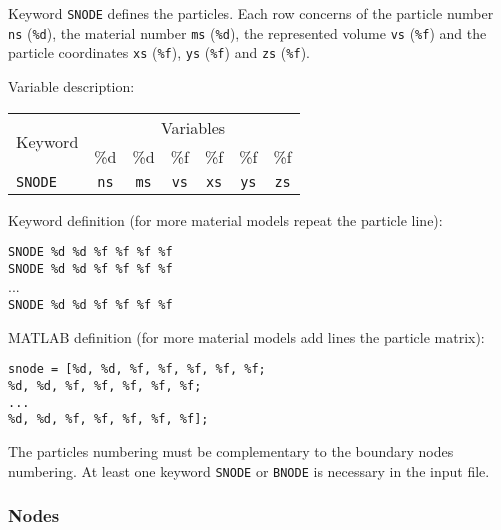Keyword \texttt{SNODE} defines the particles. Each row concerns of the particle number \texttt{ns} (\texttt{\%d}), the material number \texttt{ms} (\texttt{\%d}), the represented volume \texttt{vs} (\texttt{\%f}) and the particle coordinates \texttt{xs} (\texttt{\%f}), \texttt{ys} (\texttt{\%f}) and \texttt{zs} (\texttt{\%f}).

Variable description:

\begin{tabular}{|l|c|c|c|c|c|c|}
\hline
\multirow{2}{*}{Keyword} & \multicolumn{6}{c|}{Variables} \\ \cline{2-7}
& \%d & \%d & \%f & \%f & \%f & \%f \\ \hline
\texttt{SNODE} & \texttt{ns} & \texttt{ms} & \texttt{vs} & \texttt{xs} & \texttt{ys} & \texttt{zs} \\ \hline
\end{tabular}

Keyword definition (for more material models repeat the particle line):

\begin{tcolorbox}
\texttt{SNODE \%d \%d \%f \%f \%f \%f} \\
\texttt{SNODE \%d \%d \%f \%f \%f \%f} \\
... \\
\texttt{SNODE \%d \%d \%f \%f \%f \%f} \\
\end{tcolorbox}

MATLAB definition (for more material models add lines the particle matrix):

\begin{tcolorbox}
\texttt{snode = [\%d, \%d, \%f, \%f, \%f, \%f, \%f; \\
\%d, \%d, \%f, \%f, \%f, \%f, \%f; \\
... \\
\%d, \%d, \%f, \%f, \%f, \%f, \%f];}
\end{tcolorbox}

The particles numbering must be complementary to the boundary nodes numbering. At least one keyword \texttt{SNODE} or \texttt{BNODE} is necessary in the input file.

\newpage


\subsubsection{Nodes}

